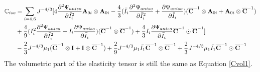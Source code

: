 \begin{equation} \label{Ciso3}
\begin{split}
\mathbb{C}_{iso} &= 
\sum_{i = 4, 6} J^{-4/3}[4\frac{\partial^2\Psi_{aniso}}{\partial{\bar{I}_i}^2} \bold{A}_{0i} \otimes \bold{A}_{0i} - \frac{4}{3}(\bar{I}_i\frac{\partial^2\Psi_{aniso}}{\partial{\bar{I}_i}^2} + \frac{\partial\Psi_{aniso}}{\partial{\bar{I}_i}})(\overline{\bold{C}}^{-1} \otimes \bold{A}_{0i} + \bold{A}_{0i} \otimes \overline{\bold{C}}^{-1}) \\
&+ \frac{4}{9}({\bar{I}_i}^2\frac{\partial^2\Psi_{aniso}}{\partial{\bar{I}_i}^2} - \bar{I}_i\frac{\partial\Psi_{aniso}}{\partial{\bar{I}_i}})(\overline{\bold{C}}^{-1} \otimes \overline{\bold{C}}^{-1}) 
+ \frac{4}{3}\bar{I}_i \frac{\partial\Psi_{aniso}}{\partial{\bar{I}_i}} \overline{\bold{C}}^{-1} \odot \overline{\bold{C}}^{-1}] \\
&- \frac{2}{3}J^{-4/3}\mu_1({\overline{\bold{C}}}^{-1} \otimes \bold{I} + \bold{I} \otimes {\overline{\bold{C}}}^{-1})  +
\frac{2}{9}J^{-4/3}\mu_1\bar{I_1}  {\overline{\bold{C}}}^{-1} \otimes {\overline{\bold{C}}}^{-1} + \frac{2}{3}J^{-4/3} \mu_1\bar{I_1} {\overline{\bold{C}}}^{-1} \odot {\overline{\bold{C}}}^{-1} 
\end{split}
\end{equation}
The volumetric part of the elasticity tensor is still the same as Equation \ref{Cvol1}.








